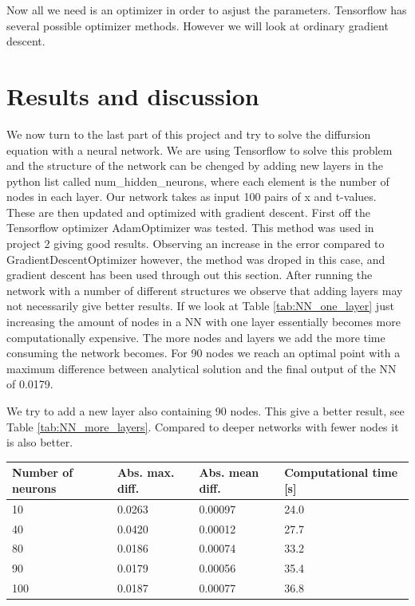 \documentclass[a4paper, twocolumn]{article}
\newcommand{\tab}[1]{Table \ref{tab:#1}}
\begin{document}
Now all we need is an optimizer in order to asjust the parameters. Tensorflow has several possible optimizer methods. However we will look at ordinary gradient descent.

\section{Results and discussion}
We now turn to the last part of this project and try to solve the diffursion equation with a neural network. We are using Tensorflow to solve this problem and the structure of the network can be chenged by adding new layers in the python list called num\_hidden\_neurons, where each element is the number of nodes in each layer. Our network takes as input 100 pairs of x and t-values. These are then updated and optimized with gradient descent. 
First off the Tensorflow optimizer AdamOptimizer was tested. This method was used in project 2 giving good results. Observing an increase in the error compared to GradientDescentOptimizer however, the method was droped in this case, and gradient descent has been used through out this section.
After running the network with a number of different structures we observe that adding layers may not necessarily give better results. If we look at \tab{NN_one_layer} just increasing the amount of nodes in a NN with one layer essentially becomes more computationally expensive. The more nodes and layers we add the more time consuming the network becomes. For 90 nodes we reach an optimal point with a maximum difference between analytical solution and the final output of the NN of 0.0179. 

We try to add a new layer also containing 90 nodes. This give a better result, see \tab{NN_more_layers}. Compared to deeper networks with fewer nodes it is also better. 

\begin{strip}
\begin{center}
 \label{tab:NN_one_layer} 
    \begin{tabular}{| l | l | l | l |}
    \hline
    Number of neurons & Abs. max. diff. & Abs. mean diff. & Computational time [s]\\ \hline
    10 & 0.0263 & 0.00097 & 24.0 \\ \hline
    40 & 0.0420 & 0.00012 & 27.7 \\ \hline
    80 & 0.0186 & 0.00074 & 33.2 \\ \hline
    90 & 0.0179 & 0.00056 & 35.4 \\ \hline
    100 & 0.0187 & 0.00077 & 36.8 \\ 
    \hline
    \end{tabular} 
\end{center}
\end{strip}
\end{document}

